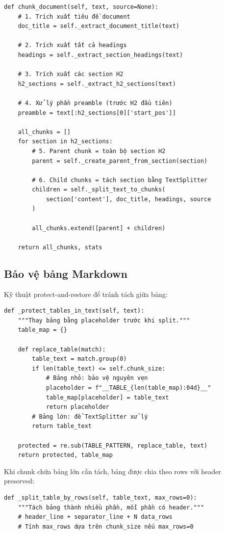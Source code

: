 \documentclass[../DoAn.tex]{subfiles}
\begin{document}
\begin{verbatim}
def chunk_document(self, text, source=None):
    # 1. Trích xuất tiêu đề document
    doc_title = self._extract_document_title(text)
    
    # 2. Trích xuất tất cả headings
    headings = self._extract_section_headings(text)
    
    # 3. Trích xuất các section H2
    h2_sections = self._extract_h2_sections(text)
    
    # 4. Xử lý phần preamble (trước H2 đầu tiên)
    preamble = text[:h2_sections[0]['start_pos']]
    
    all_chunks = []
    for section in h2_sections:
        # 5. Parent chunk = toàn bộ section H2
        parent = self._create_parent_from_section(section)
        
        # 6. Child chunks = tách section bằng TextSplitter
        children = self._split_text_to_chunks(
            section['content'], doc_title, headings, source
        )
        
        all_chunks.extend([parent] + children)
    
    return all_chunks, stats
\end{verbatim}

\subsection{Bảo vệ bảng Markdown}
Kỹ thuật protect-and-restore để tránh tách giữa bảng:

\begin{verbatim}
def _protect_tables_in_text(self, text):
    """Thay bảng bằng placeholder trước khi split."""
    table_map = {}
    
    def replace_table(match):
        table_text = match.group(0)
        if len(table_text) <= self.chunk_size:
            # Bảng nhỏ: bảo vệ nguyên vẹn
            placeholder = f"__TABLE_{len(table_map):04d}__"
            table_map[placeholder] = table_text
            return placeholder
        # Bảng lớn: để TextSplitter xử lý
        return table_text
    
    protected = re.sub(TABLE_PATTERN, replace_table, text)
    return protected, table_map
\end{verbatim}

Khi chunk chứa bảng lớn cần tách, bảng được chia theo rows với header preserved:
\begin{verbatim}
def _split_table_by_rows(self, table_text, max_rows=0):
    """Tách bảng thành nhiều phần, mỗi phần có header."""
    # header_line + separator_line + N data_rows
    # Tính max_rows dựa trên chunk_size nếu max_rows=0
\end{verbatim}
\end{document}
